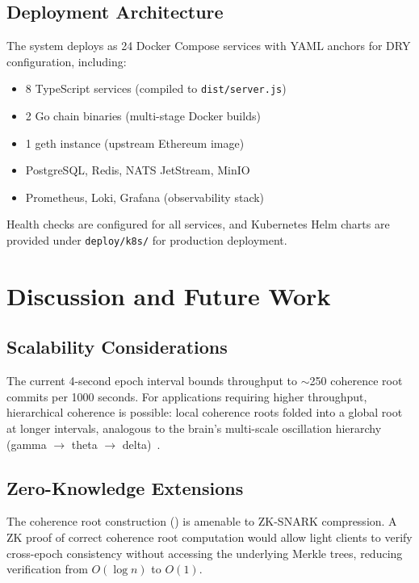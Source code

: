 \documentclass[11pt,twocolumn]{article}
\theoremstyle{definition}
\theoremstyle{plain}
\theoremstyle{remark}
\begin{document}
\subsection{Deployment Architecture}

The system deploys as 24 Docker Compose services with YAML anchors for DRY configuration, including:

\begin{itemize}[leftmargin=*,itemsep=1pt]
  \item 8 TypeScript services (compiled to \texttt{dist/server.js})
  \item 2 Go chain binaries (multi-stage Docker builds)
  \item 1 geth instance (upstream Ethereum image)
  \item PostgreSQL, Redis, NATS JetStream, MinIO
  \item Prometheus, Loki, Grafana (observability stack)
\end{itemize}

Health checks are configured for all services, and Kubernetes Helm charts are provided under \texttt{deploy/k8s/} for production deployment.

\section{Discussion and Future Work}\label{sec:discussion}

\subsection{Scalability Considerations}

The current 4-second epoch interval bounds throughput to $\sim$250 coherence root commits per 1000 seconds. For applications requiring higher throughput, hierarchical coherence is possible: local coherence roots folded into a global root at longer intervals, analogous to the brain's multi-scale oscillation hierarchy (gamma $\to$ theta $\to$ delta)~\cite{buzsaki2006rhythms}.

\subsection{Zero-Knowledge Extensions}

The coherence root construction () is amenable to ZK-SNARK compression. A ZK proof of correct coherence root computation would allow light clients to verify cross-epoch consistency without accessing the underlying Merkle trees, reducing verification from $O(\log n)$ to $O(1)$.
\end{document}
